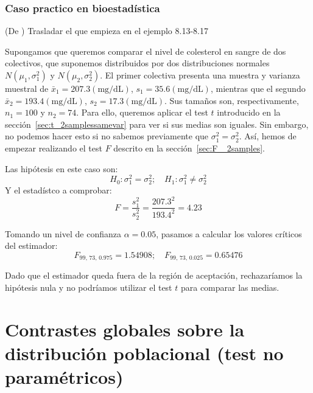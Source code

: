 \documentclass[a4paper,12pt]{article}
\begin{document}

\subsubsection*{Caso practico en bioestadística}
 (De \cite{rosner2015fundamentals}) Trasladar el que empieza en el ejemplo 8.13-8.17 

    Supongamos que queremos comparar el nivel de colesterol en sangre de dos colectivos, que suponemos distribuidos por dos distribuciones normales $N(\mu_1, \sigma_1^2)$ y $N(\mu_2, \sigma_2^2)$.
    El primer colectiva presenta una muestra y varianza muestral de $\bar{x}_1 = 207.3 (\textrm{mg/dL})$, $s_1 = 35.6 (\textrm{mg/dL})$, mientras que el segundo $\bar{x}_2 = 193.4 (\textrm{mg/dL})$, $s_2 = 17.3 (\textrm{mg/dL})$.
    Sus tamaños son, respectivamente, $n_1 = 100$ y $n_2 = 74$.
    Para ello, queremos aplicar el test $t$ introducido en la sección~\ref{sec:t_2samplessamevar} para ver si sus medias son iguales.
    Sin embargo, no podemos hacer esto si no sabemos previamente que $\sigma_1^2 = \sigma_2^2$.
    Así, hemos de empezar realizando el test $F$ descrito en la sección~\ref{sec:F_
2samples}.

    Las hipótesis en este caso son:
    \begin{equation}
	H_0:\sigma^2_1=\sigma^2_2; \quad H_1:\sigma^2_1\neq \sigma^2_2
    \end{equation}
    Y el estadístco a comprobar:
    $$F
    =
    \frac{s_1^2}{s_2^2}
    = 
    \frac{207.3^2}{193.4^2}
    =
    4.23
    $$

    Tomando un nivel de confianza $\alpha = 0.05$, pasamos a calcular los valores críticos del estimador:
    \begin{equation}
        F_{99,\, 73,\, 0.975} = 1.54908
        ; \quad
        F_{99,\, 73,\, 0.025} = 0.65476
    \end{equation}

    Dado que el estimador queda fuera de la región de aceptación, rechazaríamos la hipótesis nula y no podríamos utilizar el test $t$ para comparar las medias.
   

\section{Contrastes globales sobre la distribución poblacional (test no paramétricos)}
\end{document}
